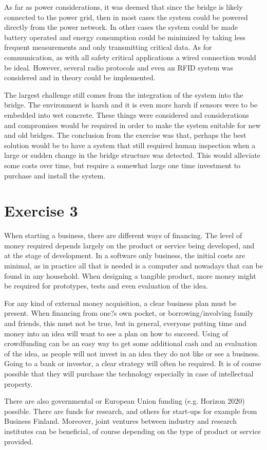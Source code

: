 \documentclass[english,12pt,a4paper,pdftex,elec,utf8]{aaltothesis}
\begin{document}
	As far as power considerations, it was deemed that since the bridge is likely connected to the power grid, then in most cases the system could be powered directly from the power network. In other cases the system could be made battery operated and energy consumption could be minimized by taking less frequent measurements and only transmitting critical data. As for communication, as with all safety critical applications a wired connection would be ideal. However, several radio protocols and even an RFID system was considered and in theory could be implemented. 
	
	The largest challenge still comes from the integration of the system into the bridge. The environment is harsh and it is even more harsh if sensors were to be embedded into wet concrete. These things were considered and considerations and compromises would be required in order to make the system suitable for new and old bridges. The conclusion from the exercise was that, perhaps the best solution would be to have a system that still required human inspection when a large or sudden change in the bridge structure was detected. This would alleviate some costs over time, but require a somewhat large one time investment to purchase and install  the system. 
	
	


\newpage


\section*{Exercise 3}

	When starting a business, there are different ways of financing. The level of money required depends largely on the product or service being developed, and at the stage of development. In a software only business, the initial costs are minimal, as in practice all that is needed is a computer and nowadays that can be found in any household. When designing a tangible product, more money might be required for prototypes, tests and even evaluation of the idea. 

	For any kind of external money acquisition, a clear business plan must be present. When financing from one?s own pocket, or borrowing/involving family and friends, this must not be true, but in general, everyone putting time and money into an idea will want to see a plan on how to succeed. Using of crowdfunding can be an easy way to get some additional cash and an evaluation of the idea, as people will not invest in an idea they do not like or see a business. Going to a bank or investor, a clear strategy will often be required. It is of course possible that they will purchase the technology especially in case of intellectual property. 

	There are also governmental or European Union funding (e.g. Horizon 2020) possible. There are funds for research, and others for start-ups for example from Business Finland. Moreover, joint ventures between industry and research institutes can be beneficial, of course depending on the type of product or service provided. 
\end{document}
